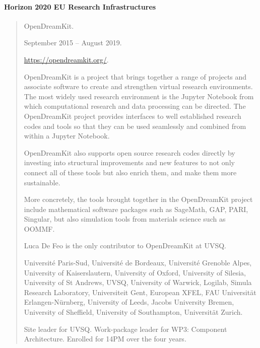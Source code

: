 \documentclass{book}
\begin{document}
\paragraph{Horizon 2020 EU Research Infrastructures}
\begin{quote}
  \begin{description}
    \setlength{\itemsep}{-0.5ex}
  \item[Project:] OpenDreamKit.
  \item[Duration:] September 2015 -- August 2019.
  \item[WWW:] \url{https://opendreamkit.org/}.
  \item[Description:] OpenDreamKit is a project that brings together a
    range of projects and associate software to create and strengthen
    virtual research environments. The most widely used research
    environment is the Jupyter Notebook from which computational
    research and data processing can be directed. The OpenDreamKit
    project provides interfaces to well established research codes and
    tools so that they can be used seamlessly and combined from within
    a Jupyter Notebook.

    OpenDreamKit also supports open source research codes directly by
    investing into structural improvements and new features to not
    only connect all of these tools but also enrich them, and make
    them more sustainable.

    More concretely, the tools brought together in the OpenDreamKit
    project include mathematical software packages such as SageMath,
    GAP, PARI, Singular, but also simulation tools from materials
    science such as OOMMF.

    Luca De Feo is the only contributor to OpenDreamKit at UVSQ.
  \item[Participants:] Université Paris-Sud, Université de Bordeaux,
    Université Grenoble Alpes, University of Kaiserslautern,
    University of Oxford, University of Silesia, University of St
    Andrews, UVSQ, University of Warwick, Logilab, Simula Research
    Laboratory, Universiteit Gent, European XFEL, FAU Universität
    Erlangen-Nürnberg, University of Leeds, Jacobs University Bremen,
    University of Sheffield, University of Southampton, Universität
    Zurich.
  \item[Role:] Site leader for UVSQ. Work-package leader for WP3:
    Component Architecture. Enrolled for 14PM over the four years.
  \end{description}
\end{quote}
\end{document}
